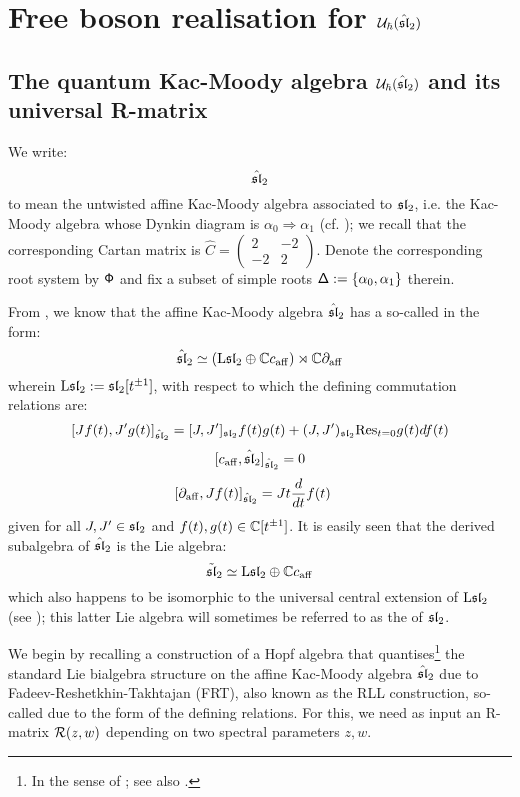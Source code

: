 \section{\texorpdfstring{Free boson realisation for $\calU_{\hbar}(\hat{\sl}_2)$}{}}
    \subsection{\texorpdfstring{The quantum Kac-Moody algebra $\calU_{\hbar}(\hat{\sl}_2)$ and its universal R-matrix}{}}
        We write:
            $$\hat{\sl}_2$$
        to mean the untwisted affine Kac-Moody algebra associated to $\sl_2$, i.e. the Kac-Moody algebra whose Dynkin diagram is $\alpha_0 \Rightarrow \alpha_1$ (cf. \cite[Chapters 4 and 7]{kac_infinite_dimensional_lie_algebras}); we recall that the corresponding Cartan matrix is $\hat{C} = \begin{pmatrix} 2 & -2 \\ -2 & 2 \end{pmatrix}$. Denote the corresponding root system by $\rootsystem$ and fix a subset of simple roots $\simpleroots := \{\alpha_0, \alpha_1\}$ therein.
        
        From \cite[Chapter 7]{kac_infinite_dimensional_lie_algebras}, we know that the affine Kac-Moody algebra $\hat{\sl}_2$ has a so-called  in the form:
            $$\hat{\sl}_2 \cong ( \Loop \sl_2 \oplus \bbC c_{\aff} ) \rtimes \bbC \del_{\aff}$$
        wherein $\Loop \sl_2 := \sl_2[t^{\pm 1}]$, with respect to which the defining commutation relations are:
            $$[J f(t), J'g(t)]_{\hat{\sl}_2} = [J, J']_{\sl_2} f(t) g(t) + (J, J')_{\sl_2} \Res_{t = 0} g(t) df(t)$$
            $$[c_{\aff}, \hat{\sl}_2]_{\hat{\sl}_2} = 0$$
            $$[\del_{\aff}, J f(t)]_{\hat{\sl}_2} = J t\frac{d}{dt} f(t) \quad$$
        given for all $J, J' \in \sl_2$ and $f(t), g(t) \in \bbC[t^{\pm 1}]$. It is easily seen that the derived subalgebra of $\hat{\sl}_2$ is the Lie algebra:
            $$\tilde{\sl}_2 \cong \Loop \sl_2 \oplus \bbC c_{\aff}$$
        which also happens to be isomorphic to the universal central extension of $\Loop \sl_2$ (see \cite{kassel_universal_central_extensions_of_lie_algebras}); this latter Lie algebra will sometimes be referred to as the  of $\sl_2$.
    
        We begin by recalling a construction of a Hopf algebra that quantises\footnote{In the sense of \cite{etingof_kazhdan_quantisation_1}; see also \cite{etingof_kazhdan_quantisation_6}.} the standard Lie bialgebra structure on the affine Kac-Moody algebra $\hat{\sl}_2$ due to Fadeev-Reshetkhin-Takhtajan (FRT), also known as the RLL construction, so-called due to the form of the defining relations. For this, we need as input an R-matrix $\calR(z, w)$ depending on two spectral parameters $z, w$.

